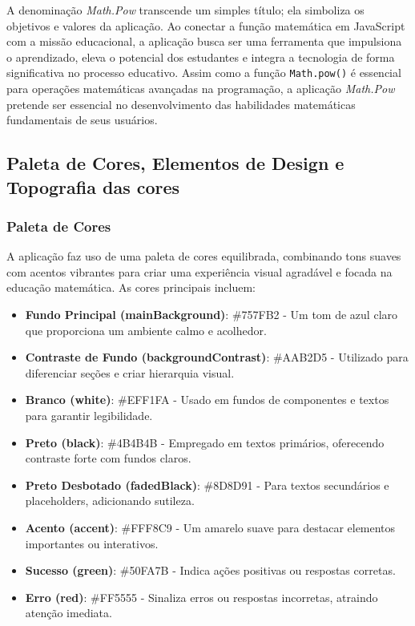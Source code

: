 A denominação \textit{Math.Pow} transcende um simples título; ela simboliza os objetivos e valores da aplicação. Ao conectar a função matemática em JavaScript com a missão educacional, a aplicação busca ser uma ferramenta que impulsiona o aprendizado, eleva o potencial dos estudantes e integra a tecnologia de forma significativa no processo educativo. Assim como a função \texttt{Math.pow()} é essencial para operações matemáticas avançadas na programação, a aplicação \textit{Math.Pow} pretende ser essencial no desenvolvimento das habilidades matemáticas fundamentais de seus usuários.


\subsection{Paleta de Cores, Elementos de Design e Topografia das cores}

\subsubsection{Paleta de Cores}

A aplicação faz uso de uma paleta de cores equilibrada, combinando tons suaves com acentos vibrantes para criar uma experiência visual agradável e focada na educação matemática. As cores principais incluem:

\begin{itemize}
    \item \textbf{Fundo Principal (mainBackground)}: \#757FB2 - Um tom de azul claro que proporciona um ambiente calmo e acolhedor.
    \item \textbf{Contraste de Fundo (backgroundContrast)}: \#AAB2D5 - Utilizado para diferenciar seções e criar hierarquia visual.
    \item \textbf{Branco (white)}: \#EFF1FA - Usado em fundos de componentes e textos para garantir legibilidade.
    \item \textbf{Preto (black)}: \#4B4B4B - Empregado em textos primários, oferecendo contraste forte com fundos claros.
    \item \textbf{Preto Desbotado (fadedBlack)}: \#8D8D91 - Para textos secundários e placeholders, adicionando sutileza.
    \item \textbf{Acento (accent)}: \#FFF8C9 - Um amarelo suave para destacar elementos importantes ou interativos.
    \item \textbf{Sucesso (green)}: \#50FA7B - Indica ações positivas ou respostas corretas.
    \item \textbf{Erro (red)}: \#FF5555 - Sinaliza erros ou respostas incorretas, atraindo atenção imediata.
\end{itemize}

